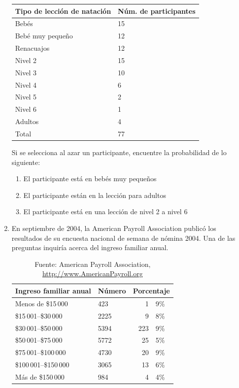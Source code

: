 \documentclass[11pt,twoside]{article}
\begin{document}
\begin{enumerate}
\begin{center}
\begin{tabular}{ll}
Tipo de lección de natación & Núm. de participantes\\ \hline
Bebés & 15\\
Bebé muy pequeño & 12\\
Renacuajos & 12\\
Nivel 2 & 15\\
Nivel 3 & 10\\
Nivel 4 & 6\\
Nivel 5 & 2\\
Nivel 6 & 1\\
Adultos & 4\\ \hline
Total & 77
\end{tabular}
\end{center}
Si se selecciona al azar un participante, encuentre la probabilidad de lo siguiente:
\begin{enumerate}
 \item El participante está en bebés muy pequeños
 \item El participante están en la lección para adultos
 \item El participante está en una lección de nivel 2 a nivel 6
\end{enumerate}
\item En septiembre de 2004, la American Payroll Association publicó los resultados de su encuesta nacional de semana de nómina 2004. Una de las preguntas
inquiría acerca del ingreso familiar anual.
\begin{table}[!h]
\begin{center}
\begin{tabular}{llr@{.}l}
Ingreso familiar anual & Número &\multicolumn{2}{l}{Porcentaje} \\ \hline
Menos de \$15\,000 & 423 & 1&9\% \\
\$15\,001--\$30\,000 & 2225 & 9&8\%\\
\$30\,001--\$50\,000 & 5394 & 223&9\%\\
\$50\,001--\$75\,000 & 5772 & 25&5\%\\
\$75\,001--\$100\,000 & 4730 & 20&9\%\\
\$100\,001--\$150\,000 & 3065 & 13&6\%\\
Más de \$150\,000 & 984 & 4&4\% \\\hline
\end{tabular}
\end{center}\caption{Fuente: American Payroll Association, \url{http://www.AmericanPayroll.org}}

\end{table}
\end{enumerate}
\end{document}
